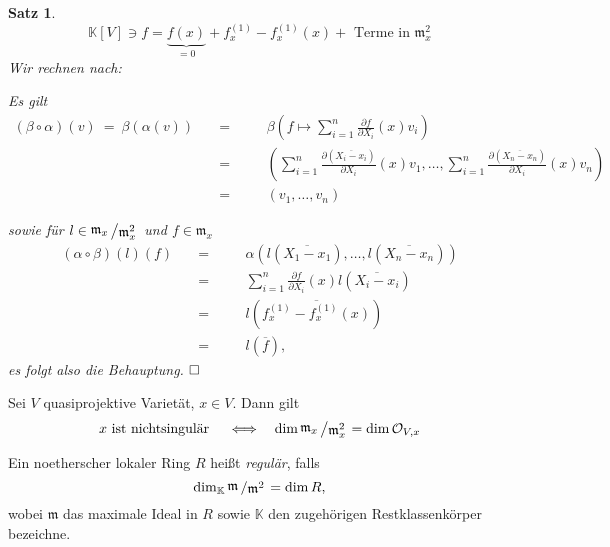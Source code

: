 \documentclass[11pt]{book}
\newtheorem{theorem}{Satz}[section]
\theoremstyle{nonumberbreak}
\newenvironment{defin}[1][]{\ifthenelse{\equal{#1}{}}{\definition}{\definition[#1]}\rm}{\enddefinition}
\newenvironment{pr}[1][]{\ifthenelse{\equal{#1}{}}{\proof}{\proof[#1]}\rm}{\endproof}
\newenvironment{folg}[1][]{\ifthenelse{\equal{#1}{}}{\folger}{\folger[#1]}\rm}{\endfolger}
\newcommand{\slant}[2]{{\raisebox{.1em}{$#1$}\left/\raisebox{-.1em}{$#2$}\right.}}
\begin{document}
\begin{spacing}{1.3}
\begin{theorem}
\begin{pr}
$$\mathbb{K}[V] \ni f = \underbrace{ f(x)}_{=0} + f_x^{(1)} - f_x^{(1)} (x) + \textrm{ Terme in } \mathfrak{m}_x^2$$
Wir rechnen nach:
\begin{compactenum}
\item Es gilt \\[-36pt]
\begin{alignat*}{5}
(\beta \circ \alpha) (v) \ = \ \beta \left(\alpha(v) \right) \quad &=&& \quad \beta \left( f \mapsto \sum_{i=1}^n \frac{ \partial f}{\partial X_i} (x) v_i \right)\\
&=&& \quad \left( \sum_{i=1}^n \frac{\partial (\overline{X_i-x_i})}{\partial X_i} (x) v_1, \ldots, \sum_{i=1}^n \frac{ \partial (\overline{X_n-x_n})}{\partial X_i} (x) v_n \right)\\
&=&& \quad (v_1, \ldots, v_n)
\end{alignat*}
\item sowie für $l \in \slant{\mathfrak{m}_x}{\mathfrak{m}_x^2}$ und $f \in \mathfrak{m}_x$ \\[-36pt]

\begin{alignat*}{7}
(\alpha \circ \beta)(l)(f) \quad &=&& \quad \alpha \left( l ( \overline{X_1-x_1}), \ldots, l ( \overline{X_n-x_n}) \right)\\
&=&& \quad \sum_{i=1}^n \frac{\partial f}{\partial X_i} (x) l(\overline{X_i-x_i}) \\
&=&& \quad l \left(\overline{f_x^{(1)}- f_x^{(1)}(x)} \right)\\
&=&& \quad l(\overline{f}),
\end{alignat*}  
es folgt also die Behauptung. $\hfill \Box$
\end{compactenum}
\end{pr}
\end{theorem}


\begin{folg} %
Sei $V$ quasiprojektive Varietät, $x \in V$. Dann gilt
$$x \textrm{ ist nichtsingulär }\quad  \Longleftrightarrow \quad \dim \slant{\mathfrak{m}_x}{\mathfrak{m}_x^2} = \dim \mathcal{O}_{V,x}$$
\end{folg}

\begin{defin} %

Ein noetherscher lokaler Ring $R$ heißt \textit{regulär}, falls
$$\dim_{\mathbb{K}} \slant{\mathfrak{m}}{\mathfrak{m}^2} = \dim R,$$
wobei $\mathfrak{m}$ das maximale Ideal in $R$ sowie $\mathbb{K}$ den zugehörigen Restklassenkörper bezeichne.
\end{defin}


\end{spacing}
\end{document}

